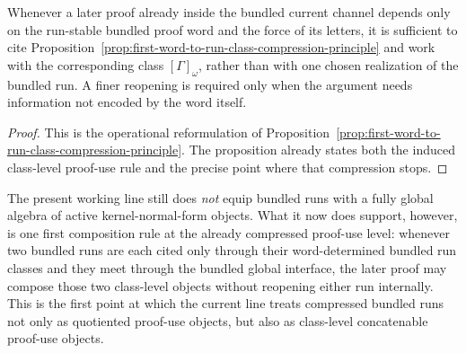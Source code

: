 \begin{corollary}
\label{cor:use-rule-for-the-first-word-to-run-class-compression-principle}
Whenever a later proof already inside the bundled current channel depends only on the run-stable bundled proof word and the force of its letters, it is sufficient to cite Proposition~\ref{prop:first-word-to-run-class-compression-principle} and work with the corresponding class $[\Gamma]_{\omega}$, rather than with one chosen realization of the bundled run. A finer reopening is required only when the argument needs information not encoded by the word itself.
\end{corollary}

\begin{proof}
This is the operational reformulation of Proposition~\ref{prop:first-word-to-run-class-compression-principle}. The proposition already states both the induced class-level proof-use rule and the precise point where that compression stops.
\end{proof}



\begin{remark}
\label{rem:status-of-the-first-run-class-concatenation-step}
The present working line still does \emph{not} equip bundled runs with a fully global algebra of active kernel-normal-form objects. What it now does support, however, is one first composition rule at the already compressed proof-use level: whenever two bundled runs are each cited only through their word-determined bundled run classes and they meet through the bundled global interface, the later proof may compose those two class-level objects without reopening either run internally. This is the first point at which the current line treats compressed bundled runs not only as quotiented proof-use objects, but also as class-level concatenable proof-use objects.
\end{remark}

